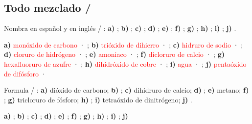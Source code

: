 \subsection{Todo mezclado / }

\begin{exercise}
    Nombra en español y en inglés / : \textbf{a)} ; \textbf{b)} ; \textbf{c)} ; \textbf{d)} ; \textbf{e)} ; \textbf{f)} ; \textbf{g)} ; \textbf{h)} ; \textbf{i)} ; \textbf{j)} .
    \begin{solu}
        \textbf{a)} \textcolor{red}{monóxido de carbono} · \textcolor{red}{}; \textbf{b)} \textcolor{red}{trióxido de dihierro} · \textcolor{red}{}; \textbf{c)} \textcolor{red}{hidruro de sodio} · \textcolor{red}{}; \textbf{d)} \textcolor{red}{cloruro de hidrógeno} · \textcolor{red}{}; \textbf{e)} \textcolor{red}{amoniaco} · \textcolor{red}{}; \textbf{f)} \textcolor{red}{dicloruro de calcio} · \textcolor{red}{}; \textbf{g)} \textcolor{red}{hexafluoruro de azufre} · \textcolor{red}{}; \textbf{h)} \textcolor{red}{dihidróxido de cobre} · \textcolor{red}{}; \textbf{i)} \textcolor{red}{agua} · \textcolor{red}{}; \textbf{j)} \textcolor{red}{pentaóxido de difósforo} · \textcolor{red}{}
    \end{solu}
\end{exercise}

\begin{exercise}
    Formula / : \textbf{a)} dióxido de carbono; \textbf{b)} ; \textbf{c)} dihidruro de calcio; \textbf{d)} ; \textbf{e)} metano; \textbf{f)} ; \textbf{g)} tricloruro de fósforo; \textbf{h)} ; \textbf{i)} tetraóxido de dinitrógeno; \textbf{j)} .
    \begin{solu}
        \textbf{a)} \textcolor{red}{}; \textbf{b)} \textcolor{red}{}; \textbf{c)} \textcolor{red}{}; \textbf{d)} \textcolor{red}{}; \textbf{e)} \textcolor{red}{}; \textbf{f)} \textcolor{red}{}; \textbf{g)} \textcolor{red}{}; \textbf{h)} \textcolor{red}{}; \textbf{i)} \textcolor{red}{}; \textbf{j)} \textcolor{red}{}
    \end{solu}
\end{exercise}
